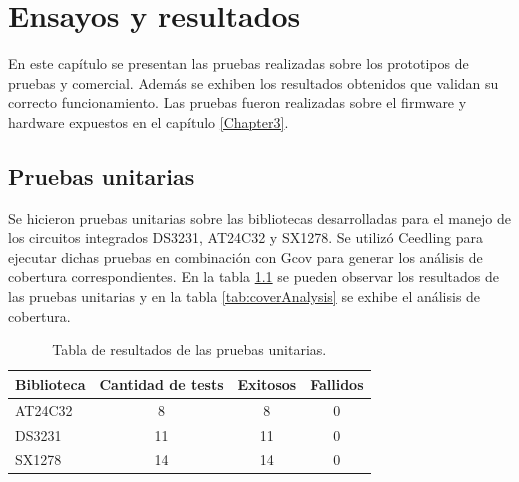 
\chapter{Ensayos y resultados} %

\label{Chapter4} %



En este capítulo se presentan las pruebas realizadas sobre los prototipos de pruebas y comercial. Además se exhiben los resultados obtenidos que validan su correcto funcionamiento. Las pruebas fueron realizadas sobre el firmware y hardware expuestos en el capítulo \ref{Chapter3}.


\section{Pruebas unitarias}
\label{sec:pruebasU}

Se hicieron pruebas unitarias sobre las bibliotecas desarrolladas para el manejo de los circuitos integrados DS3231, AT24C32 y SX1278. Se utilizó Ceedling para ejecutar dichas pruebas en combinación con Gcov para generar los análisis de cobertura correspondientes. En la tabla \ref{tab:resultsCeedling} se pueden observar los resultados de las pruebas unitarias y en la tabla \ref{tab:coverAnalysis} se exhibe el análisis de cobertura.

\begin{table}[h]
	\centering
	\caption[Pruebas unitarias]{Tabla de resultados de las pruebas unitarias.}
	\begin{tabular}{l c c c}    
		\toprule
		\textbf{Biblioteca} & \textbf{Cantidad de tests} & \textbf{Exitosos} & \textbf{Fallidos}  \\
		\midrule
		AT24C32 & 8	& 8 & 0 \\		
		DS3231 & 11 & 11 & 0 \\
		SX1278 & 14 & 14 & 0 \\
		\bottomrule
		\hline
	\end{tabular}
	\label{tab:resultsCeedling}
\end{table}

